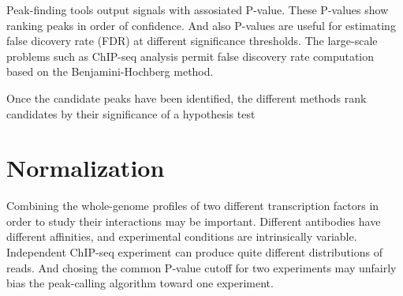 

Peak-finding tools output signals with assosiated P-value.
These P-values show ranking peaks in order of confidence.
And also P-values are useful for estimating false dicovery rate (FDR) at different significance thresholds.
% 
The large-scale problems such as ChIP-seq analysis permit false discovery rate computation based on the Benjamini-Hochberg method.



Once the candidate peaks have been identified, the different methods rank candidates by their significance of a hypothesis test

\section{Normalization}
Combining the whole-genome profiles of two different transcription factors in order to study their interactions may be important.
Different antibodies have different affinities, and experimental conditions are intrinsically variable.
Independent ChIP-seq experiment can produce quite different distributions of reads.
And chosing the common P-value cutoff for two experiments may unfairly bias the peak-calling algorithm toward one experiment.
